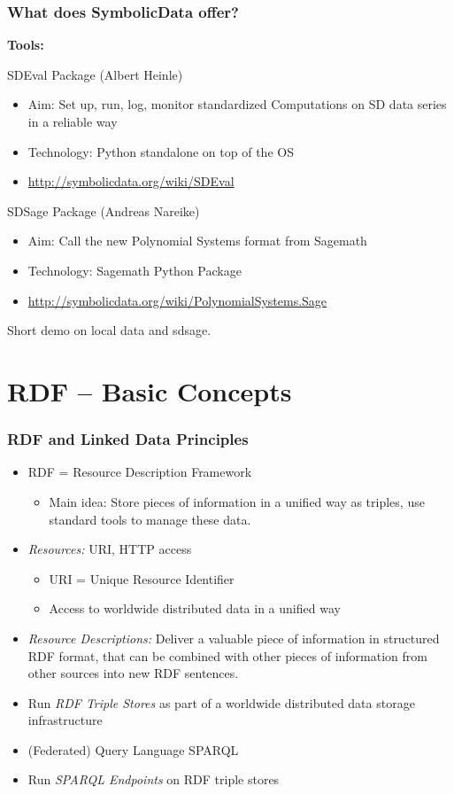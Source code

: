 \documentclass{beamer}
\begin{document}
\begin{frame}\frametitle{What does SymbolicData offer?}
\textbf{Tools:}\bigskip

SDEval Package (Albert Heinle)
\begin{itemize}\small
\item Aim: Set up, run, log, monitor standardized Computations on SD data
  series in a reliable way 
\item Technology: Python standalone on top of the OS
\item \url{http://symbolicdata.org/wiki/SDEval}
\end{itemize}
SDSage Package (Andreas Nareike)
\begin{itemize}\small
\item Aim: Call the new Polynomial Systems format from Sagemath 
\item Technology: Sagemath Python Package
\item \url{http://symbolicdata.org/wiki/PolynomialSystems.Sage}
\end{itemize}
Short demo on local data and sdsage.
\end{frame}

\section{RDF -- Basic Concepts}
\begin{frame}\frametitle{RDF and Linked Data Principles}
\begin{itemize}
\item RDF = Resource Description Framework
\begin{itemize}\small
\item Main idea: Store pieces of information in a unified way as triples,
  use standard tools to manage these data.
\end{itemize}
\item \emph{Resources:} URI, HTTP access
\begin{itemize}\small
\item URI = Unique Resource Identifier
\item Access to worldwide distributed data in a unified way
\end{itemize}
\item \emph{Resource Descriptions:} Deliver a valuable piece of information in
  structured RDF format, that can be combined with other pieces of information
  from other sources into new RDF sentences.
\item Run \emph{RDF Triple Stores} as part of a worldwide distributed data
  storage infrastructure
\item (Federated) Query Language SPARQL
\item Run \emph{SPARQL Endpoints} on RDF triple stores
\end{itemize}
\end{frame}
\end{document}

